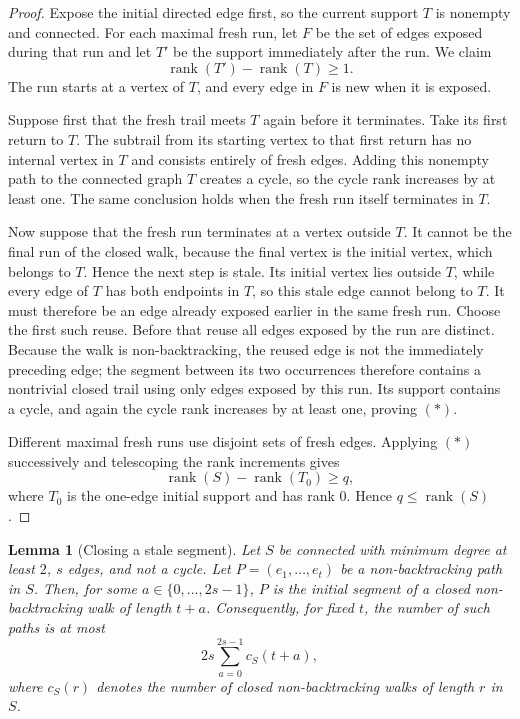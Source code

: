 \documentclass[11pt]{article}
\newtheorem{lemma}{Lemma}
\theoremstyle{remark}
\begin{document}
\begin{proof}
Expose the initial directed edge first, so the current support $T$ is nonempty and connected.
For each maximal fresh run, let $F$ be the set of edges exposed during that run and let
$T'$ be the support immediately after the run. We claim
\[
\operatorname{rank}(T')-\operatorname{rank}(T)\ge1.\tag{*}
\]
The run starts at a vertex of $T$, and every edge in $F$ is new when it is exposed.

Suppose first that the fresh trail meets $T$ again before it terminates. Take its first
return to $T$. The subtrail from its starting vertex to that first return has no internal
vertex in $T$ and consists entirely of fresh edges. Adding this nonempty path to the
connected graph $T$ creates a cycle, so the cycle rank increases by at least one. The same
conclusion holds when the fresh run itself terminates in $T$.

Now suppose that the fresh run terminates at a vertex outside $T$. It cannot be the final
run of the closed walk, because the final vertex is the initial vertex, which belongs to $T$.
Hence the next step is stale. Its initial vertex lies outside $T$, while every edge of $T$ has
both endpoints in $T$, so this stale edge cannot belong to $T$. It must therefore be an edge
already exposed earlier in the same fresh run. Choose the first such reuse. Before that reuse
all edges exposed by the run are distinct. Because the walk is non-backtracking, the reused
edge is not the immediately preceding edge; the segment between its two occurrences therefore
contains a nontrivial closed trail using only edges exposed by this run. Its support contains
a cycle, and again the cycle rank increases by at least one, proving $(*)$.

Different maximal fresh runs use disjoint sets of fresh edges. Applying $(*)$ successively
and telescoping the rank increments gives
\[
\operatorname{rank}(S)-\operatorname{rank}(T_0)\ge q,
\]
where $T_0$ is the one-edge initial support and has rank $0$. Hence
$q\le\operatorname{rank}(S)$.
\end{proof}

\begin{lemma}[Closing a stale segment]\label{lem:stale}
Let $S$ be connected with minimum degree at least $2$, $s$ edges, and not
a cycle. Let $P=(e_1,\ldots,e_t)$ be a non-backtracking path in $S$.
Then, for some $a\in\{0,\ldots,2s-1\}$, $P$ is the initial segment of a
closed non-backtracking walk of length $t+a$. Consequently, for fixed $t$,
the number of such paths is at most
\[
2s\sum_{a=0}^{2s-1}c_S(t+a),
\]
where $c_S(r)$ denotes the number of closed non-backtracking walks of
length $r$ in $S$.
\end{lemma}
\end{document}

